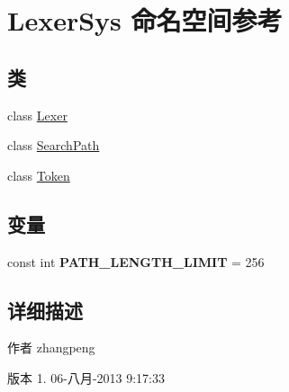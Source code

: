 \hypertarget{namespace_lexer_sys}{\section{Lexer\-Sys 命名空间参考}
\label{namespace_lexer_sys}
}
\subsection*{类}
\begin{DoxyCompactItemize}
\item 
class \hyperlink{class_lexer_sys_1_1_lexer}{Lexer}
\item 
class \hyperlink{class_lexer_sys_1_1_search_path}{Search\-Path}
\item 
class \hyperlink{class_lexer_sys_1_1_token}{Token}
\end{DoxyCompactItemize}
\subsection*{变量}
\begin{DoxyCompactItemize}
\item 
\hypertarget{namespace_lexer_sys_adbbadc36e46ed4eee23ccd26993e0c49}{const int {\bfseries P\-A\-T\-H\-\_\-\-L\-E\-N\-G\-T\-H\-\_\-\-L\-I\-M\-I\-T} = 256}\label{namespace_lexer_sys_adbbadc36e46ed4eee23ccd26993e0c49}

\end{DoxyCompactItemize}


\subsection{详细描述}
\begin{DoxyAuthor}{作者}
zhangpeng 
\end{DoxyAuthor}
\begin{DoxyVersion}{版本}
1.  06-\/八月-\/2013 9\-:17\-:33 
\end{DoxyVersion}
